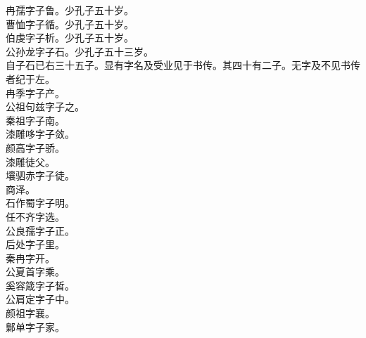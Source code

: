 \documentclass{zhvt-classic}
\begin{document}
\hspace*{2em}冉孺字子鲁。少孔子五十岁。\\
\hspace*{2em}曹恤字子循。少孔子五十岁。\\
\hspace*{2em}伯虔字子析。少孔子五十岁。\\
\hspace*{2em}公孙龙字子石。少孔子五十三岁。\\
\hspace*{2em}自子石已右三十五子。显有字名及受业见于书传。其四十有二子。无字及不见书传者纪于左。\\
\hspace*{2em}冉季字子产。\\
\hspace*{2em}公祖句兹字子之。\\
\hspace*{2em}秦祖字子南。\\
\hspace*{2em}漆雕哆字子敛。\\
\hspace*{2em}颜高字子骄。\\
\hspace*{2em}漆雕徒父。\\
\hspace*{2em}壤驷赤字子徒。\\
\hspace*{2em}商泽。\\
\hspace*{2em}石作蜀字子明。\\
\hspace*{2em}任不齐字选。\\
\hspace*{2em}公良孺字子正。\\
\hspace*{2em}后处字子里。\\
\hspace*{2em}秦冉字开。\\
\hspace*{2em}公夏首字乘。\\
\hspace*{2em}奚容箴字子皙。\\
\hspace*{2em}公肩定字子中。\\
\hspace*{2em}颜祖字襄。\\
\hspace*{2em}鄡单字子家。\\
\end{document}
